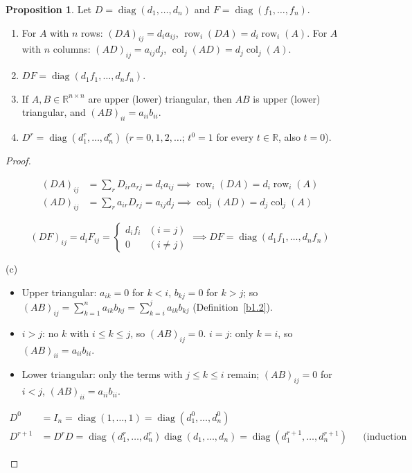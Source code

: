 \documentclass[12pt]{article}
\newcommand{\R}{\mathbb R}
\DeclareMathOperator{\col}{col}
\DeclareMathOperator{\diag}{diag}
\theoremstyle{definition}
\newtheorem{proposition}[theorem]{Proposition}
\newcommand{\boardtop}{\vspace*{-\abovedisplayskip}}
\DeclareMathOperator{\row}{row}
\begin{document}
\begin{proposition}\label{b1.13}\label{b1.19}
Let \(D=\diag(d_1,\dots,d_n)\) and \(F=\diag(f_1,\dots,f_n)\).
\begin{enumerate}
\item For \(A\) with \(n\) rows: \((DA)_{ij}=d_ia_{ij}\), \(\row_i(DA)=d_i\row_i(A)\). For \(A\) with \(n\) columns:
\((AD)_{ij}=a_{ij}d_j\), \(\col_j(AD)=d_j\col_j(A)\).
\item \(DF=\diag(d_1f_1,\dots,d_nf_n)\).
\item If \(A,B\in\R^{n\times n}\) are upper (lower) triangular, then \(AB\) is upper (lower) triangular, and
\((AB)_{ii}=a_{ii}b_{ii}\).
\item \(D^r=\diag(d_1^r,\dots,d_n^r)\) (\(r=0,1,2,\dots\); \(t^0=1\) for every \(t\in\R\), also \(t=0\)).
\end{enumerate}
\end{proposition}
\begin{proof}
\begin{board}[(a) The \((i,r)\) entry of \(D\) is \(d_i\) if \(r=i\), \(0\) if \(r\ne i\): one term of each sum
survives (Definition~\ref{b1.2}):]
\boardtop
\begin{align*}
(DA)_{ij}&=\textstyle\sum_rD_{ir}a_{rj}=d_ia_{ij}\implies\row_i(DA)=d_i\row_i(A)\\
(AD)_{ij}&=\textstyle\sum_ra_{ir}D_{rj}=a_{ij}d_j\implies\col_j(AD)=d_j\col_j(A)
\end{align*}
\end{board}
\begin{board}[(b) By (a):]
\[
(DF)_{ij}=d_iF_{ij}=\begin{cases}d_if_i&(i=j)\\0&(i\ne j)\end{cases}\implies DF=\diag(d_1f_1,\dots,d_nf_n)
\]
\end{board}
(c)
\begin{itemize}
\item Upper triangular: \(a_{ik}=0\) for \(k<i\), \(b_{kj}=0\) for \(k>j\); so
\((AB)_{ij}=\sum_{k=1}^na_{ik}b_{kj}=\sum_{k=i}^ja_{ik}b_{kj}\) (Definition~\ref{b1.2}).
\item \(i>j\): no \(k\) with \(i\leqslant k\leqslant j\), so \((AB)_{ij}=0\). \(i=j\): only \(k=i\), so
\((AB)_{ii}=a_{ii}b_{ii}\).
\item Lower triangular: only the terms with \(j\leqslant k\leqslant i\) remain; \((AB)_{ij}=0\) for \(i<j\),
\((AB)_{ii}=a_{ii}b_{ii}\).
\end{itemize}
\begin{board}
\boardtop
\begin{align*}
D^0&=I_n=\diag(1,\dots,1)=\diag(d_1^0,\dots,d_n^0)\\
D^{r+1}&=D^rD=\diag(d_1^r,\dots,d_n^r)\diag(d_1,\dots,d_n)=\diag(d_1^{r+1},\dots,d_n^{r+1})&&\text{(induction hypothesis; (b))}
\end{align*}
\end{board}
\nopagebreak
\end{proof}
\end{document}
